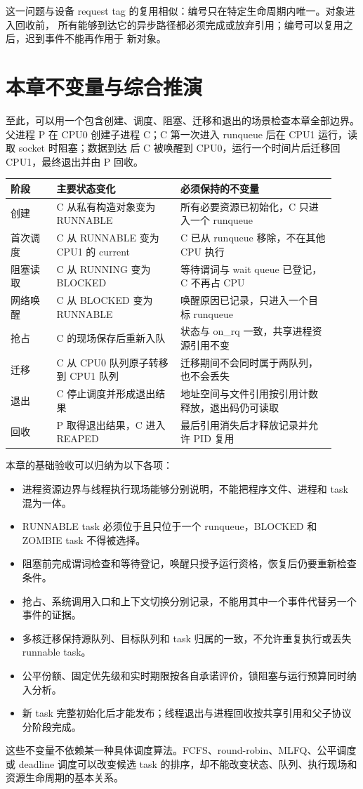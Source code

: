 这一问题与设备 request tag 的复用相似：编号只在特定生命周期内唯一。对象进入回收前，
所有能够到达它的异步路径都必须完成或放弃引用；编号可以复用之后，迟到事件不能再作用于
新对象。

\section{本章不变量与综合推演}

至此，可以用一个包含创建、调度、阻塞、迁移和退出的场景检查本章全部边界。父进程 P 在
CPU0 创建子进程 C；C 第一次进入 runqueue 后在 CPU1 运行，读取 socket 时阻塞；数据到达
后 C 被唤醒到 CPU0，运行一个时间片后迁移回 CPU1，最终退出并由 P 回收。

\begin{longtable}{|L{0.13\linewidth}|L{0.35\linewidth}|L{0.44\linewidth}|}
\toprule
阶段 & 主要状态变化 & 必须保持的不变量 \\
\midrule
创建 & C 从私有构造对象变为 RUNNABLE & 所有必要资源已初始化，C 只进入一个 runqueue \\\tablerowrule
首次调度 & C 从 RUNNABLE 变为 CPU1 的 current & C 已从 runqueue 移除，不在其他 CPU 执行 \\\tablerowrule
阻塞读取 & C 从 RUNNING 变为 BLOCKED & 等待谓词与 wait queue 已登记，C 不再占 CPU \\\tablerowrule
网络唤醒 & C 从 BLOCKED 变为 RUNNABLE & 唤醒原因已记录，只进入一个目标 runqueue \\\tablerowrule
抢占 & C 的现场保存后重新入队 & 状态与 on\_rq 一致，共享进程资源引用不变 \\\tablerowrule
迁移 & C 从 CPU0 队列原子转移到 CPU1 队列 & 迁移期间不会同时属于两队列，也不会丢失 \\\tablerowrule
退出 & C 停止调度并形成退出结果 & 地址空间与文件引用按引用计数释放，退出码仍可读取 \\\tablerowrule
回收 & P 取得退出结果，C 进入 REAPED & 最后引用消失后才释放记录并允许 PID 复用 \\
\bottomrule
\end{longtable}

本章的基础验收可以归纳为以下各项：

\begin{itemize}
\tightlist
\item 进程资源边界与线程执行现场能够分别说明，不能把程序文件、进程和 task 混为一体。
\item RUNNABLE task 必须位于且只位于一个 runqueue，BLOCKED 和 ZOMBIE task 不得被选择。
\item 阻塞前完成谓词检查和等待登记，唤醒只授予运行资格，恢复后仍要重新检查条件。
\item 抢占、系统调用入口和上下文切换分别记录，不能用其中一个事件代替另一个事件的证据。
\item 多核迁移保持源队列、目标队列和 task 归属的一致，不允许重复执行或丢失 runnable task。
\item 公平份额、固定优先级和实时期限按各自承诺评价，锁阻塞与运行预算同时纳入分析。
\item 新 task 完整初始化后才能发布；线程退出与进程回收按共享引用和父子协议分阶段完成。
\end{itemize}

这些不变量不依赖某一种具体调度算法。FCFS、round-robin、MLFQ、公平调度或 deadline
调度可以改变候选 task 的排序，却不能改变状态、队列、执行现场和资源生命周期的基本关系。
